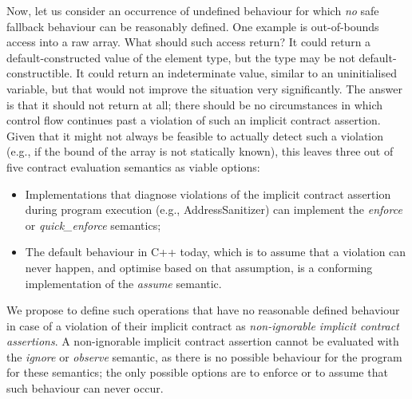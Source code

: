 Now, let us consider an occurrence of undefined behaviour for which \emph{no} safe fallback behaviour can be reasonably defined. One example is out-of-bounds access into a raw array. What should such access return? It could return a default-constructed value of the element type, but the type may be not default-constructible. It could return an indeterminate value, similar to an uninitialised variable, but that would not improve the situation very significantly. The answer is that it should not return at all; there should be no circumstances in which control flow continues past a violation of such an implicit contract assertion. Given that it might not always be feasible to actually detect such a violation (e.g., if the bound of the array is not statically known), this leaves three out of five contract evaluation semantics as viable options:
\begin{itemize}
\item Implementations that diagnose violations of the implicit contract assertion during program execution (e.g., AddressSanitizer) can implement the \emph{enforce} or \emph{quick_enforce} semantics;
\item The default behaviour in C++ today, which is to assume that a violation can never happen, and optimise based on that assumption, is a conforming implementation of the \emph{assume} semantic.
\end{itemize}
We propose to define such operations that have no reasonable defined behaviour in case of a violation of their implicit contract  as \emph{non-ignorable implicit contract assertions}. A non-ignorable implicit contract assertion cannot be evaluated with the \emph{ignore} or \emph{observe} semantic, as there is no possible behaviour for the program for these semantics; the only possible options are to enforce or to assume that such behaviour can never occur.
%      

